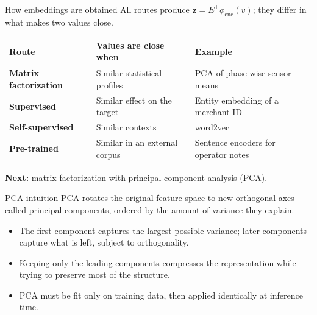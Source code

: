 \begin{frame}{How embeddings are obtained}
\begingroup\small
All routes produce $\mathbf{z} = E^{\top}\phi_{\mathrm{enc}}(v)$; they differ in what makes two values close.
\par\endgroup
\vspace{0.8em}
\begingroup\small
\renewcommand{\arraystretch}{1.5}
\begin{tabularx}{\textwidth}{>{\bfseries}l >{\raggedright\arraybackslash}X >{\raggedright\arraybackslash}X}
Route & Values are close when & Example \\
\toprule
Matrix factorization & Similar statistical profiles & PCA of phase-wise sensor means \\
Supervised & Similar effect on the target & Entity embedding of a merchant ID \\
Self-supervised & Similar contexts & word2vec \\
Pre-trained & Similar in an external corpus & Sentence encoders for operator notes \\
\bottomrule
\end{tabularx}
\par\endgroup
\vspace{0.8em}
\begingroup\small
\textbf{Next:} matrix factorization with principal component analysis (PCA).
\par\endgroup
\coursefooter
\end{frame}

\begin{frame}{PCA intuition}
PCA rotates the original feature space to new orthogonal axes called principal components, ordered by the amount of variance they explain.
\vspace{0.5em}
\begin{itemize}
\item The first component captures the largest possible variance; later components capture what is left, subject to orthogonality.
\item Keeping only the leading components compresses the representation while trying to preserve most of the structure.
\item PCA must be fit only on training data, then applied identically at inference time.
\end{itemize}
\coursefooter
\end{frame}

